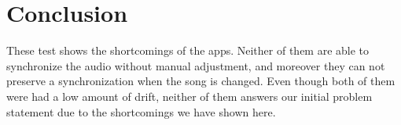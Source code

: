 \section{Conclusion}\label{sec:sota_test_conclusion}
These test shows the shortcomings of the apps.
Neither of them are able to synchronize the audio without manual adjustment, and moreover they can not preserve a synchronization when the song is changed.
Even though both of them were had a low amount of drift, neither of them answers our initial problem statement due to the shortcomings we have shown here.
